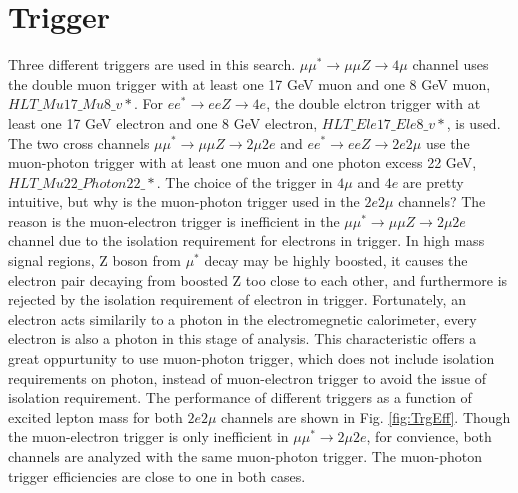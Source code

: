 \pagebreak
\newpage

\section{Trigger}

\label{sec:trigger}Three different triggers are used in this search. $\mu\mu^{*} \rightarrow \mu\mu Z \rightarrow 4\mu$ channel uses the double muon trigger with at least one 17 GeV muon and one 8 GeV muon, $HLT\_Mu17\_Mu8\_v*$. For $e e^{*} \rightarrow e e Z \rightarrow 4e$, the double elctron trigger with at least one 17 GeV electron and one 8 GeV electron, $HLT\_Ele17\_Ele8\_v*$, is used. The two cross channels $\mu\mu^{*} \rightarrow \mu\mu Z \rightarrow 2\mu 2e$ and $e e^{*} \rightarrow e e Z \rightarrow 2e 2\mu$ use the muon-photon trigger with at least one muon and one photon excess 22 GeV, $HLT\_Mu22\_Photon22\_*$.
\newline
The choice of the trigger in $4\mu$ and $4e$ are pretty intuitive, but why is the muon-photon trigger used in the $2e2\mu$ channels? The reason is the muon-electron trigger is inefficient in the $\mu\mu^{*} \rightarrow \mu\mu Z \rightarrow 2\mu 2e$ channel due to the isolation requirement for electrons in trigger. In high mass signal regions, Z boson from $\mu^{*}$ decay may be highly boosted, it causes the electron pair decaying from boosted Z too close to each other, and furthermore is rejected by the isolation requirement of electron in trigger. Fortunately, an electron acts similarily to a photon in the electromegnetic calorimeter, every electron is also a photon in this stage of analysis. This characteristic offers a great oppurtunity to use muon-photon trigger, which does not include isolation requirements on photon, instead of muon-electron trigger to avoid the issue of isolation requirement. The performance of different triggers as a function of excited lepton mass for both $2e2\mu$ channels are shown in Fig. \ref{fig:TrgEff}. Though the muon-electron trigger is only inefficient in $\mu\mu^{*} \rightarrow 2\mu2e$, for convience, both channels are analyzed with the same muon-photon trigger. The muon-photon trigger efficiencies are close to one in both cases.

